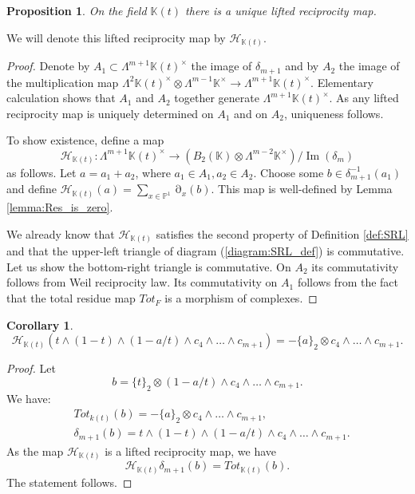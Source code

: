 \documentclass[12pt]{extarticle}
\newtheorem{corollary}[theorem]{Corollary}
\newtheorem{proposition}[theorem]{Proposition}
\def\mb{\mathbb}
\def\mc{\mathcal}
\def\k{\mb K}
\def\t{\times}
\def\wdw{\wedge\dots\wedge}
\DeclareMathOperator{\ts}{\partial}
\DeclareMathOperator{\im}{Im}
\begin{document}
\begin{proposition}
\label{prop:strong_low_P^1}
\label{prop:SRL_P1}
On the field $\k(t)$ there is a unique lifted reciprocity map. 
\end{proposition}

We will denote this lifted reciprocity map by $\mc H_{\k(t)}$.

\begin{proof}Denote by $A_1\subset \Lambda^{m+1}\k(t)^\t$ the image of $\delta_{m+1}$ and by $A_2$ the image of the multiplication map $\Lambda^2 \k(t)^\t\otimes \Lambda^{m-1}\k^\t\to\Lambda^{m+1}\k(t)^\t$. Elementary calculation shows that $A_1$ and $A_2$ together generate $\Lambda^{m+1}\k(t)^\t$. As any lifted reciprocity map is uniquely determined on $A_1$ and on $A_2$, uniqueness follows.

To show existence, define a map $$\mc H_{\k(t)}\colon \Lambda^{m+1}\k(t)^\t\to (B_2(\k)\otimes \Lambda^{m-2}\k^\t)/\im(\delta_m)$$ as follows. Let $a=a_1+a_2$, where $a_1\in A_1, a_2\in A_2$. Choose some $b\in \delta_{m+1}^{-1}(a_1)$ and define $\mc H_{\k(t)}(a)=\sum\limits_{x\in\mathbb P^1}\ts_x(b)$. This map is well-defined by Lemma \ref{lemma:Res_is_zero}. 

We already know that $\mc H_{\k(t)}$ satisfies the second property of Definition \ref{def:SRL}  and that the upper-left triangle of diagram (\ref{diagram:SRL_def}) is commutative. Let us show the bottom-right triangle is commutative. On $A_2$ its commutativity follows from Weil reciprocity law. Its commutativity on $A_1$ follows from the fact that the total residue map $Tot_F$ is a morphism of complexes.
\end{proof}

\begin{corollary}
\label{cor:SRL_on_Totaro}
    $$\mc H_{\k(t)}(t\wedge (1-t)\wedge (1-a/t)\wedge c_4\wdw c_{m+1})=-\{a\}_2\otimes c_4\wdw c_{m+1}.$$
\end{corollary}
\begin{proof}
Let $$b=\{t\}_2\otimes (1-a/t)\wedge c_4\wdw c_{m+1}.$$
We have:
\begin{align*}
    &Tot_{k(t)}(b)=-\{a\}_2\otimes c_4\wdw c_{m+1},\\& \delta_{m+1}(b)=t\wedge (1-t)\wedge (1-a/t)\wedge c_4\wdw c_{m+1}.
\end{align*}
As the map $\mc H_{\k(t)}$ is a lifted reciprocity map, we have
$$\mc H_{\k(t)}\delta_{m+1}(b)=Tot_{\k(t)}(b).$$ 
The statement follows.
\end{proof}
\end{document}
